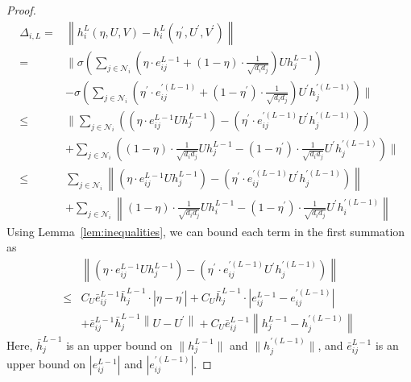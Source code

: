 \begin{proof}
    \begin{align*}
        \Delta_{i, L}=
        &\left\|h_i^{L}(\eta, U, V) - h_i^{L}(\eta^\prime, U^\prime, V^\prime)\right\| \\
        =& \Big\|\sigma \left(\sum_{j \in \mathcal{N}_i}\left(\eta \cdot e_{ij}^{L-1} + (1 - \eta) \cdot \frac{1}{\sqrt{d_i d_j }}\right)U  h_j^{L-1}\right)\\
        &- \sigma \left(\sum_{j \in \mathcal{N}_i}\left(\eta^\prime \cdot e_{ij}^{\prime(L-1)}  + (1 - \eta^\prime) \cdot \frac{1}{\sqrt{d_i d_j }} \right) U^{\prime}  h_j^{\prime (L-1)} \right)\Big\|
        \\
        \leq & \Big\| \sum_{j \in \mathcal{N}_i} \left((\eta \cdot e_{ij}^{L-1} U  h_j^{L-1}) - (\eta^\prime \cdot e_{ij}^{\prime(L-1)} U^{\prime}  h_j^{\prime(L-1)})\right)
        \\
        &+ \sum_{j \in \mathcal{N}_i} \left((1 - \eta) \cdot \frac{1}{\sqrt{d_i d_j }} U h_j^{L-1} - (1 - \eta^\prime) \cdot \frac{1}{\sqrt{d_i d_j }} U^{\prime}  h_j^{\prime (L-1)}\right)\Big\|
        \tag{since $\sigma$ is $1$-Lipschitz}
        \\
        \leq & \sum_{j \in \mathcal{N}_i} \left\|(\eta \cdot e_{ij}^{L-1} U  h_j^{L-1}) - (\eta^\prime \cdot e_{ij}^{\prime(L-1)} U^{\prime}  h_j^{\prime(L-1)})\right\|\\
        &+ \sum_{j \in \mathcal{N}_i} \left\|(1 - \eta) \cdot \frac{1}{\sqrt{d_i d_j }} U  h_i^{L-1} - (1 - \eta^\prime) \cdot \frac{1}{\sqrt{d_i d_j }} U^{\prime }  h_i^{\prime (L-1)}\right\|
        \tag{by triangle inequality}
    \end{align*}
    Using Lemma~\ref{lem:inequalities}, we can bound each term in the first summation as
    \begin{align*}
         &\left\|\left(\eta \cdot e_{ij}^{L-1} U  h_j^{L-1}\right) - \left(\eta^\prime \cdot e_{ij}^{\prime(L-1)} U^{\prime}  h_j^{\prime(L-1)}\right)\right\|\\
         \leq & C_U \bar e_{ij}^{L-1} \bar h_j^{L-1} \cdot |\eta - \eta^\prime|
         + C_U \bar h_j^{L-1}\cdot \left|e_{ij}^{L-1} - e_{ij}^{\prime (L-1)}\right|\\
         &+ \bar e_{ij}^{L-1} \bar h_j^{L-1} \left\|U - U^{\prime}\right\|
         + C_U \bar e_{ij}^{L-1} \left\|h_j^{L-1} - h_j^{\prime (L-1)}\right\|
    \end{align*}
    Here, $\bar h_j^{L-1}$ is an upper bound on $\|h_j^{L-1}\|$ and $\|h_j^{\prime (L-1)}\|$, and $\bar e_{ij}^{L-1}$ is an upper bound on $|e_{ij}^{L-1}|$ and $|e_{ij}^{\prime(L-1)}|$.
    

\end{proof}
